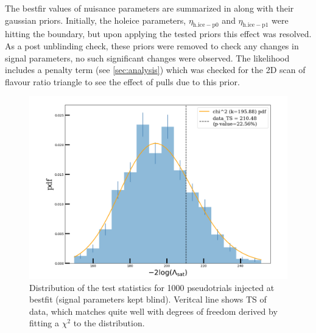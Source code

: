 The bestfir values of nuisance parameters are summarized in  along with their gaussian priors. Initially, the holeice parameters, $\eta_{\mathrm{h.ice-p0}}$ and $\eta_{\mathrm{h.ice-p1}}$ were hitting the boundary, but upon applying the tested priors this effect was resolved. As a post unblinding check, these priors were removed to check any changes in signal parameters, no such significant changes were observed. The likelihood includes a penalty term (see \ref{sec:analysis}) which was checked for the 2D scan of flavour ratio triangle to see the effect of pulls due to this prior.     

\begin{figure}[ht]
	\includegraphics[scale=0.5]{./figures/results/GOF.pdf}
	\caption{Distribution of the test statistics for 1000 pseudotrials injected at bestfit (signal parameters kept blind). Veritcal line shows TS of data, which matches quite well with degrees of freedom derived by fitting a $\chi^2$ to the distribution.}
\end{figure}

